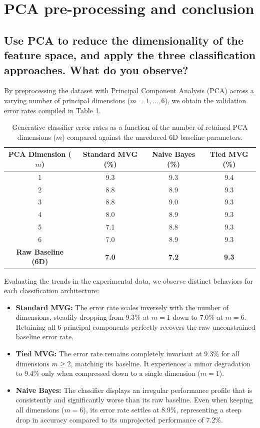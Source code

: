 \section{PCA pre-processing and conclusion}

\subsection*{Use PCA to reduce the dimensionality of the feature space, and apply the three classification approaches. What do you observe?}

By preprocessing the dataset with Principal Component Analysis (PCA) across a varying number of principal dimensions ($m = 1, \dots, 6$), we obtain the validation error rates compiled in Table \ref{tab:mvg_pca_results}.

\begin{table}[H]
    \centering
    \begin{tabular}{|c|c|c|c|}
        \hline
        \textbf{PCA Dimension ($m$)} & \textbf{Standard MVG (\%)} & \textbf{Naive Bayes (\%)} & \textbf{Tied MVG (\%)} \\
        \hline
        1 & 9.3 & 9.3 & 9.4 \\
        2 & 8.8 & 8.9 & 9.3 \\
        3 & 8.8 & 9.0 & 9.3 \\
        4 & 8.0 & 8.9 & 9.3 \\
        5 & 7.1 & 8.8 & 9.3 \\
        6 & 7.0 & 8.9 & 9.3 \\
        \hline
        \textbf{Raw Baseline (6D)} & \textbf{7.0} & \textbf{7.2} & \textbf{9.3} \\
        \hline
    \end{tabular}
    \caption{Generative classifier error rates as a function of the number of retained PCA dimensions ($m$) compared against the unreduced 6D baseline parameters.}
    \label{tab:mvg_pca_results}
\end{table}

Evaluating the trends in the experimental data, we observe distinct behaviors for each classification architecture:
\begin{itemize}
    \item \textbf{Standard MVG:} The error rate scales inversely with the number of dimensions, steadily dropping from 9.3\% at $m=1$ down to 7.0\% at $m=6$. Retaining all 6 principal components perfectly recovers the raw unconstrained baseline error rate.
    \item \textbf{Tied MVG:} The error rate remains completely invariant at 9.3\% for all dimensions $m \ge 2$, matching its baseline. It experiences a minor degradation to 9.4\% only when compressed down to a single dimension ($m=1$).
    \item \textbf{Naive Bayes:} The classifier displays an irregular performance profile that is consistently and significantly worse than its raw baseline. Even when keeping all dimensions ($m=6$), its error rate settles at 8.9\%, representing a steep drop in accuracy compared to its unprojected performance of 7.2\%.
\end{itemize}

